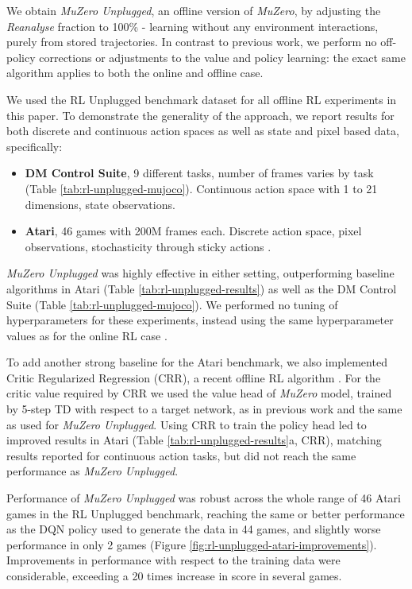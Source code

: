 \documentclass{article}
\newcommand{\muzero}{\emph{MuZero}}
\newcommand{\reanalyse}{\emph{Reanalyse}}
\newcommand{\mzunplugged}{\emph{MuZero Unplugged}}
\begin{document}
We obtain \mzunplugged{}, an offline version of \muzero{}, by adjusting the \reanalyse{} fraction to 100\% - learning without any environment interactions, purely from stored trajectories. In contrast to previous work, we perform no off-policy corrections or adjustments to the value and policy learning: the exact same algorithm applies to both the online and offline case.

We used the RL Unplugged \cite{rl_unplugged} benchmark dataset for all offline RL experiments in this paper. To demonstrate the generality of the approach, we report results for both discrete and continuous action spaces as well as state and pixel based data, specifically:
\begin{itemize}
\setlength\itemsep{0em}
\item \textbf{DM Control Suite}, 9 different tasks, number of frames varies by task (Table \ref{tab:rl-unplugged-mujoco}). Continuous action space with 1 to 21 dimensions, state observations.
\item \textbf{Atari}, 46 games with 200M frames each. Discrete action space, pixel observations, stochasticity through sticky actions \cite{Marlos2017Atari}.
\end{itemize}

\mzunplugged{} was highly effective in either setting, outperforming baseline algorithms in Atari (Table \ref{tab:rl-unplugged-results}) as well as the DM Control Suite (Table \ref{tab:rl-unplugged-mujoco}). We performed no tuning of hyperparameters for these experiments, instead using the same hyperparameter values as for the online RL case \cite{muzero, muzero_sampled}.

To add another strong baseline for the Atari benchmark, we also implemented Critic Regularized Regression (CRR), a recent offline RL algorithm \cite{wang2020critic}. For the critic value required by CRR we used the value head of \muzero{} model, trained by 5-step TD with respect to a target network, as in previous work \cite{muzero} and the same as used for \mzunplugged{}. Using CRR to train the policy head led to improved results in Atari (Table \ref{tab:rl-unplugged-results}a, CRR), matching results reported for continuous action tasks, but did not reach the same performance as \mzunplugged{}.

Performance of \mzunplugged{} was robust across the whole range of 46 Atari games in the RL Unplugged benchmark, reaching the same or better performance as the DQN policy used to generate the data in 44 games, and slightly worse performance in only 2 games (Figure \ref{fig:rl-unplugged-atari-improvements}). Improvements in performance with respect to the training data were considerable, exceeding a 20 times increase in score in several games.
\end{document}
